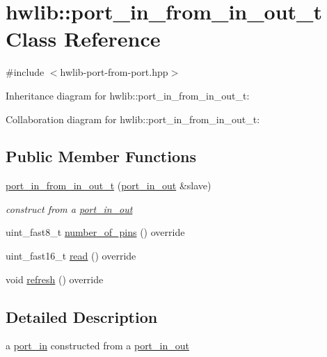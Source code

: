 \hypertarget{classhwlib_1_1port__in__from__in__out__t}{}\section{hwlib\+:\+:port\+\_\+in\+\_\+from\+\_\+in\+\_\+out\+\_\+t Class Reference}
\label{classhwlib_1_1port__in__from__in__out__t}


{\ttfamily \#include $<$hwlib-\/port-\/from-\/port.\+hpp$>$}



Inheritance diagram for hwlib\+:\+:port\+\_\+in\+\_\+from\+\_\+in\+\_\+out\+\_\+t\+:


Collaboration diagram for hwlib\+:\+:port\+\_\+in\+\_\+from\+\_\+in\+\_\+out\+\_\+t\+:
\subsection*{Public Member Functions}
\begin{DoxyCompactItemize}
\item 
\mbox{\label{classhwlib_1_1port__in__from__in__out__t_a17b3fbe9813082c8a5497fc906fb163c}} 
\hyperlink{classhwlib_1_1port__in__from__in__out__t_a17b3fbe9813082c8a5497fc906fb163c}{port\+\_\+in\+\_\+from\+\_\+in\+\_\+out\+\_\+t} (\hyperlink{classhwlib_1_1port__in__out}{port\+\_\+in\+\_\+out} \&slave)
\begin{DoxyCompactList}\small\item\em construct from a \hyperlink{classhwlib_1_1port__in__out}{port\+\_\+in\+\_\+out} \end{DoxyCompactList}\item 
uint\+\_\+fast8\+\_\+t \hyperlink{classhwlib_1_1port__in__from__in__out__t_a297458e2944e9952b09a36fe6ac30caf}{number\+\_\+of\+\_\+pins} () override
\item 
uint\+\_\+fast16\+\_\+t \hyperlink{classhwlib_1_1port__in__from__in__out__t_ab5307198f2acb61897da52a1043fa7a6}{read} () override
\item 
void \hyperlink{classhwlib_1_1port__in__from__in__out__t_a0f499254dadfe9f8306b03b7b7a90d9f}{refresh} () override
\end{DoxyCompactItemize}


\subsection{Detailed Description}
a \hyperlink{classhwlib_1_1port__in}{port\+\_\+in} constructed from a \hyperlink{classhwlib_1_1port__in__out}{port\+\_\+in\+\_\+out}

